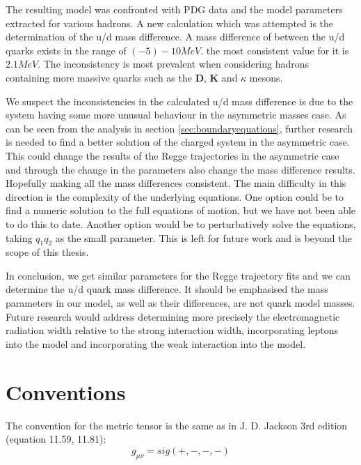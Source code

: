 \documentclass[11pt,a4paper]{article}
\begin{document}
The resulting model was confronted with PDG data and the model parameters extracted for various hadrons. A new calculation which was attempted is the determination of the u/d mass difference. A mass difference of between the u/d quarks exists in the range of $(-5)-10MeV$. the most consistent value for it is $2.1 MeV$. The inconsistency is most prevalent when considering hadrons containing more massive quarks such as the \textbf{D}, \textbf{K} and \textbf{$\kappa$} mesons.

We suspect the inconsistencies in the calculated u/d mass difference is due to the system having some more unusual behaviour in the asymmetric masses case. As can be seen from the analysis in section \ref{sec:boundaryequations}, further research is needed to find a better solution of the charged system in the asymmetric case. This could change the results of the Regge trajectories in the asymmetric case and through the change in the parameters also change the mass difference results. Hopefully making all the mass differences consistent. The main difficulty in this direction is the complexity of the underlying equations. One option could be to find a numeric solution to the full equations of motion, but we have not been able to do this to date. Another option would be to perturbatively solve the equations, taking $q_1q_2$ as the small parameter. This is left for future work and is beyond the scope of this thesis.

In conclusion, we get similar parameters for the Regge trajectory fits and we can determine the u/d quark mass difference. It should be emphasised the mass parameters in our model, as well as their differences, are not quark model masses. Future research would address determining more precisely the electromagnetic radiation width relative to the strong interaction width, incorporating leptons into the model and incorporating the weak interaction into the model. 
\appendix
\FloatBarrier
\section{Conventions}
The convention for the metric tensor is the same as in J. D. Jackson 3rd edition (equation 11.59, 11.81):
\begin{equation*}
g_{\mu\nu}=sig(+,-,-,-)
\end{equation*}
\end{document}
